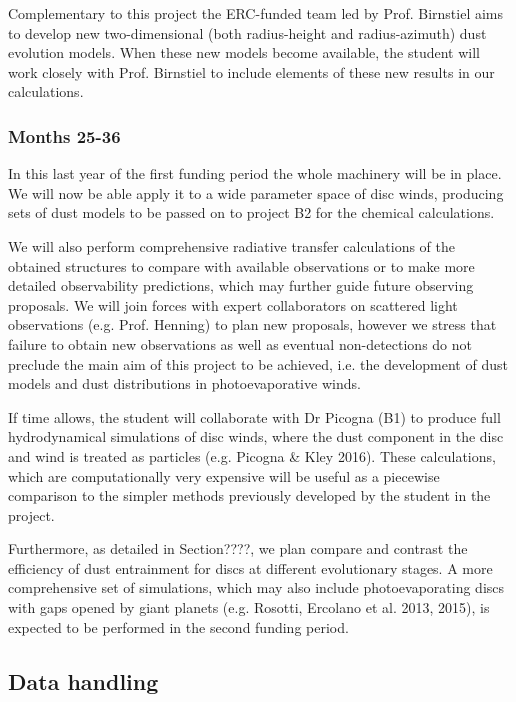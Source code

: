 \documentclass[10pt,fleqn,twoside]{article}
\newcommand{\Tcol}{\color{blue}}
\begin{document}
Complementary to this project the ERC-funded team led by
Prof. Birnstiel aims to develop new two-dimensional (both
radius-height and radius-azimuth) dust evolution
models. When these new models become available, the student will work
closely with Prof. Birnstiel to include elements of these new results
in our calculations. 

\subsubsection{Months 25-36}

In this last year of the first funding period the whole machinery will
be in place. We will now be able apply it to a wide parameter
space of disc winds, producing sets of dust models to be passed on to
project B2 for the chemical calculations. 

We will also perform comprehensive radiative transfer calculations of
the obtained structures to compare with available observations or to
make more detailed observability predictions, which may further guide
future observing proposals. We will join forces with expert
collaborators on scattered light observations (e.g. Prof. Henning) to
plan new proposals, however we stress that failure to obtain new
observations as well as eventual non-detections do not preclude the
main aim of this project to be achieved, i.e. the development
of dust models and dust distributions in photoevaporative winds. 

If time allows, the student will collaborate with Dr Picogna (B1) to
produce full hydrodynamical simulations of disc winds, where the dust
component in the disc and wind is treated as particles (e.g. Picogna
\& Kley 2016). These calculations, which are computationally very expensive
will be useful as a piecewise comparison to the simpler methods previously
developed by the student in the project.  

Furthermore, as detailed in Section????, we plan compare and contrast
the efficiency of dust entrainment for discs at different evolutionary
stages. A more comprehensive set of simulations, which may also include
photoevaporating discs with gaps opened by giant planets
(e.g. Rosotti, Ercolano et al. 2013, 2015), is expected to be
performed in the second funding period. 

\vspace{0.5em}


\subsection{\Tcol Data handling}
\end{document}
